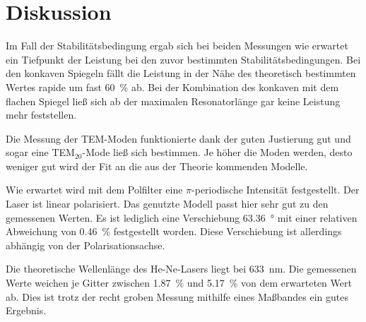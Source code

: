 \section{Diskussion}
\label{sec:Diskussion}

Im Fall der Stabilitätsbedingung ergab sich bei beiden Messungen wie erwartet ein Tiefpunkt der Leistung bei den zuvor bestimmten Stabilitätsbedingungen. 
Bei den konkaven Spiegeln fällt die Leistung in der Nähe des theoretisch bestimmten Wertes rapide um fast \SI{60}{\percent} ab.
Bei der Kombination des konkaven mit dem flachen Spiegel ließ sich ab der maximalen Resonatorlänge gar keine Leistung mehr feststellen. 

Die Messung der TEM-Moden funktionierte dank der guten Justierung gut und sogar eine TEM$_{20}$-Mode ließ sich bestimmen. 
Je höher die Moden werden, desto weniger gut wird der Fit an die aus der Theorie kommenden Modelle.

Wie erwartet wird mit dem Polfilter eine $\pi$-periodische Intensität festgestellt. Der Laser ist linear polarisiert. Das genutzte Modell passt hier sehr gut zu den gemessenen Werten. 
Es ist lediglich eine Verschiebung \SI{63.36}{\degree} mit einer relativen Abweichung von \SI{0.46}{\percent} festgestellt worden. Diese Verschiebung ist allerdings abhängig von der Polarisationsachse. %

Die theoretische Wellenlänge des He-Ne-Lasers liegt bei \SI{633}{\nano\meter}. Die gemessenen Werte weichen je Gitter zwischen \SI{1.87}{\percent} und \SI{5.17}{\percent} von dem erwarteten Wert ab. Dies ist trotz der recht groben Messung mithilfe eines Maßbandes ein gutes Ergebnis. 
